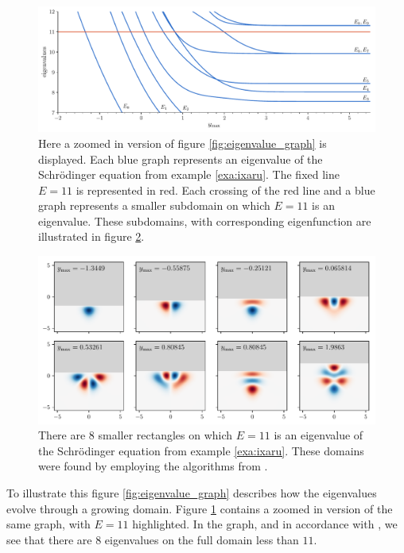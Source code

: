\begin{figure}
  \begin{center}
    \includegraphics[width=1\textwidth]{img/chapter3/counting/counting_eigenvalues_zoom.pdf}
    \caption{\label{fig:counting_eigenvalues_zoom} Here a zoomed in version of figure \ref{fig:eigenvalue_graph} is displayed. Each blue graph represents an eigenvalue of the Schrödinger equation from example \ref{exa:ixaru}. The fixed line $E = 11$ is represented in red. Each crossing of the red line and a blue graph represents a smaller subdomain on which $E=11$ is an eigenvalue. These subdomains, with corresponding eigenfunction are illustrated in figure \ref{fig:ixaru_potential}.}
  \end{center}
\end{figure}

\begin{figure}
  \begin{center}
    \includegraphics[width=1\textwidth]{img/chapter3/counting/ixaru.pdf}
    \caption{\label{fig:ixaru_potential} There are 8 smaller rectangles on which $E = 11$ is an eigenvalue of the Schrödinger equation from example \ref{exa:ixaru}. These domains were found by employing the algorithms from \cite{baeyens_improvements_2022}.}
  \end{center}
\end{figure}

To illustrate this figure \ref{fig:eigenvalue_graph} describes how the eigenvalues evolve through a growing domain. Figure \ref{fig:counting_eigenvalues_zoom} contains a zoomed in version of the same graph, with $E=11$ highlighted. In the graph, and in accordance with \cite{ixaru_new_2010}, we see that there are $8$ eigenvalues on the full domain less than $11$.

